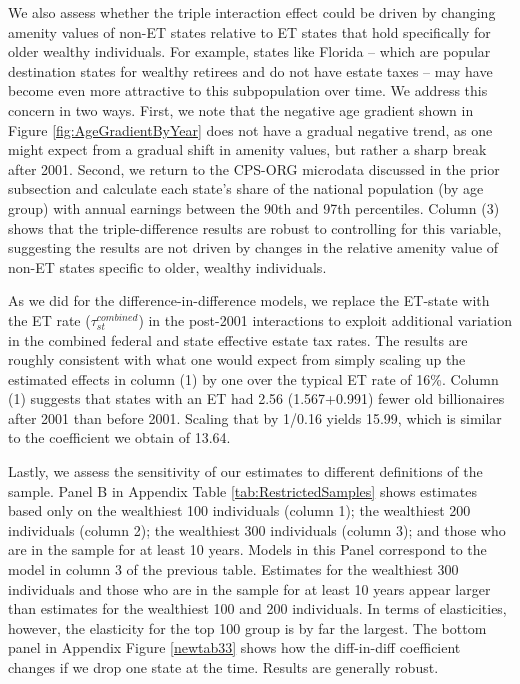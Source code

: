 \documentclass[12pt]{article}
\begin{document}
We also assess whether the triple interaction effect could be driven by changing amenity values of non-ET states relative to ET states that hold specifically for older wealthy individuals. For example, states like Florida -- which are popular destination states for wealthy retirees and do not have estate taxes -- may have become even more attractive to this subpopulation over time. We address this concern in two ways. First, we note that the negative age gradient shown in Figure \ref{fig:AgeGradientByYear} does not have a gradual negative trend, as one might expect from a gradual shift in amenity values, but rather a sharp break after 2001. Second, we return to the CPS-ORG microdata discussed in the prior subsection and calculate each state's share of the national population (by age group) with annual earnings between the 90th and 97th percentiles. Column (3) shows that the triple-difference results are robust to controlling for this variable, suggesting the results are not driven by changes in the relative amenity value of non-ET states specific to older, wealthy individuals.

As we did for the difference-in-difference models, we replace the ET-state with the ET rate ($\tau^{combined}_{st}$) in the post-2001 interactions to exploit additional variation in the combined federal and state effective estate tax rates. The results are roughly consistent with what one would expect from simply scaling up the estimated effects in column (1) by one over the typical ET rate of 16\%. Column (1) suggests that states with an ET had 2.56 (1.567+0.991) fewer old billionaires after 2001 than before 2001. Scaling that by 1/0.16 yields 15.99, which is similar to the coefficient we obtain of 13.64.

Lastly, we assess the sensitivity of our estimates to different definitions of the sample.  Panel B in Appendix Table \ref{tab:RestrictedSamples} shows estimates based only on the wealthiest 100 individuals (column 1); 
the wealthiest 200 individuals (column 2); the wealthiest 300 individuals (column 3); and those who are in the sample for at least 10 years. Models in this Panel correspond to the model in column 3 of the previous table. Estimates for the wealthiest 300 individuals  and those who are in the sample for at least 10 years appear larger than estimates for the wealthiest 100 and 200 individuals. In terms of elasticities, however, the elasticity for the top 100 group is by far the largest.  The bottom panel in Appendix Figure \ref{newtab33} shows how  the diff-in-diff coefficient changes if we drop one state at the time.  Results are generally robust. 
\end{document}
